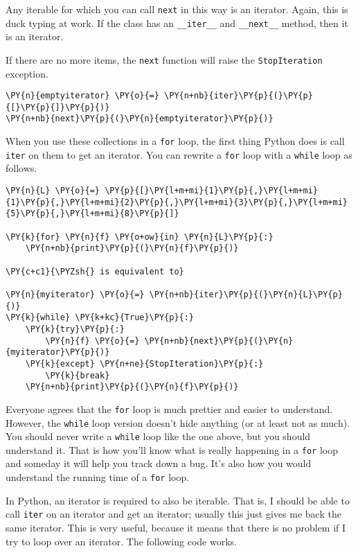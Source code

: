 Any iterable for which you can call \texttt{next} in this way is an iterator.  Again, this is duck typing at work.  If the class has an \texttt{\_\_iter\_\_} and \texttt{\_\_next\_\_} method, then it is an iterator.


If there are no more items, the \texttt{next} function will raise the \texttt{StopIteration} exception.

\begin{Verbatim}[commandchars=\\\{\}]
\PY{n}{emptyiterator} \PY{o}{=} \PY{n+nb}{iter}\PY{p}{(}\PY{p}{[}\PY{p}{]}\PY{p}{)}
\PY{n+nb}{next}\PY{p}{(}\PY{n}{emptyiterator}\PY{p}{)}
\end{Verbatim}



When you use these collections in a \texttt{for} loop, the first thing Python does is call \texttt{iter} on them to get an iterator.   You can rewrite a \texttt{for} loop with a \texttt{while} loop as follows.

\begin{Verbatim}[commandchars=\\\{\}]
\PY{n}{L} \PY{o}{=} \PY{p}{[}\PY{l+m+mi}{1}\PY{p}{,}\PY{l+m+mi}{1}\PY{p}{,}\PY{l+m+mi}{2}\PY{p}{,}\PY{l+m+mi}{3}\PY{p}{,}\PY{l+m+mi}{5}\PY{p}{,}\PY{l+m+mi}{8}\PY{p}{]}

\PY{k}{for} \PY{n}{f} \PY{o+ow}{in} \PY{n}{L}\PY{p}{:}
    \PY{n+nb}{print}\PY{p}{(}\PY{n}{f}\PY{p}{)}

\PY{c+c1}{\PYZsh{} is equivalent to}

\PY{n}{myiterator} \PY{o}{=} \PY{n+nb}{iter}\PY{p}{(}\PY{n}{L}\PY{p}{)}
\PY{k}{while} \PY{k+kc}{True}\PY{p}{:}
    \PY{k}{try}\PY{p}{:}
        \PY{n}{f} \PY{o}{=} \PY{n+nb}{next}\PY{p}{(}\PY{n}{myiterator}\PY{p}{)}
    \PY{k}{except} \PY{n+ne}{StopIteration}\PY{p}{:}
        \PY{k}{break}
    \PY{n+nb}{print}\PY{p}{(}\PY{n}{f}\PY{p}{)}
\end{Verbatim}



Everyone agrees that the \texttt{for} loop is much prettier and easier to understand.  However, the \texttt{while} loop version doesn’t hide anything (or at least not as much).  You should never write a \texttt{while} loop like the one above, but you should understand it.  That is how you’ll know what is really happening in a \texttt{for} loop and someday it will help you track down a bug.  It’s also how you would understand the running time of a \texttt{for} loop.


In Python, an iterator is required to also be iterable.  That is, I should be able to call \texttt{iter} on an iterator and get an iterator; usually this just gives me back the same iterator.  This is very useful, because it means that there is no problem if I try to loop over an iterator.  The following code works.

